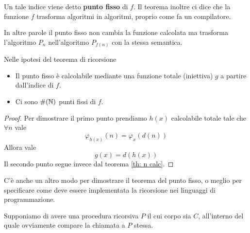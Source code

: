 Un tale indice viene detto \textbf{punto fisso} di $f$. Il
teorema inoltre ci dice che la funzione $f$ trasforma algoritmi
in algoritmi, proprio come fa un compilatore.

In altre parole il punto fisso non cambia la funzione calcolata
ma trasforma l'algoritmo $P_n$ nell'algoritmo $P_{f(n)}$ con la
stessa semantica.

\begin{property}
	Nelle ipotesi del teorema di ricorsione
	\begin{itemize}
		\item Il punto fisso è calcolabile mediante una funzione
		      totale (iniettiva) $g$ a partire dall'indice di
		      $f$.
		\item Ci sono $\# (\mathbb{N})$ punti fissi di $f$.
	\end{itemize}
\end{property}

\begin{proof}
	Per dimostrare il primo punto prendiamo $h(x)$
	calcolabile totale tale che $\forall n$ vale
	\[ \varphi_{h(x)} (n) = \varphi_x (d(n)) \]
	Allora vale
	\[ g(x) = d(h(x)) \]
	Il secondo punto segue invece dal teorema
	\ref{th: n calc}.
\end{proof}

C'è anche un altro modo per dimostrare il teorema del punto
fisso, o meglio per specificare come deve essere implementata
la ricorsione nei linguaggi di programmazione.

Supponiamo di avere una procedura ricorsiva $P$ il cui corpo
sia $C$, all'interno del quale ovviamente compare la chiamata
a $P$ stessa.